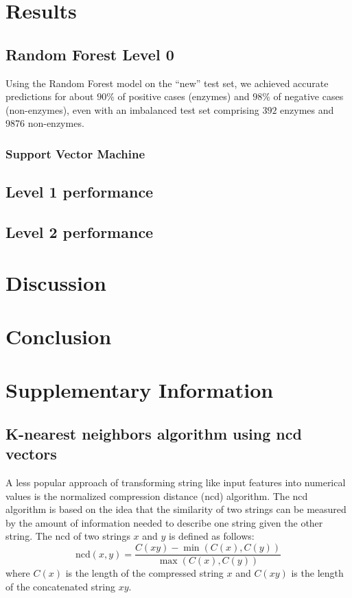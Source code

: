 \documentclass{bioinfo}
\begin{document}
\section{Results}	

\subsection{Random Forest Level 0}
Using the Random Forest model on the “new” test set, we achieved accurate predictions for about 
$90\%$ of positive cases (enzymes) and $98\%$ of negative cases (non-enzymes), even with an imbalanced test set comprising 
$392$ enzymes and 9876 non-enzymes.

\subsubsection{Support Vector Machine}


\subsection{Level 1 performance}
\subsection{Level 2 performance}




\section{Discussion}

\section{Conclusion}

\section{Supplementary Information}

\subsection{K-nearest neighbors algorithm using ncd vectors}
A less popular approach of transforming string like input features into numerical values is the normalized compression distance (ncd) algorithm. 
The ncd algorithm is based on the idea that the similarity of two strings can be measured by the amount of information needed to describe one string given the other string. The ncd of two strings $x$ and $y$ is defined as follows:
\begin{equation}
	\text{ncd}(x,y) = \frac{C(xy)-\min(C(x),C(y))}{\max(C(x),C(y))}
\end{equation}
where $C(x)$ is the length of the compressed string $x$  and $C(xy)$ is the length of the concatenated string $xy$. 
\end{document}
